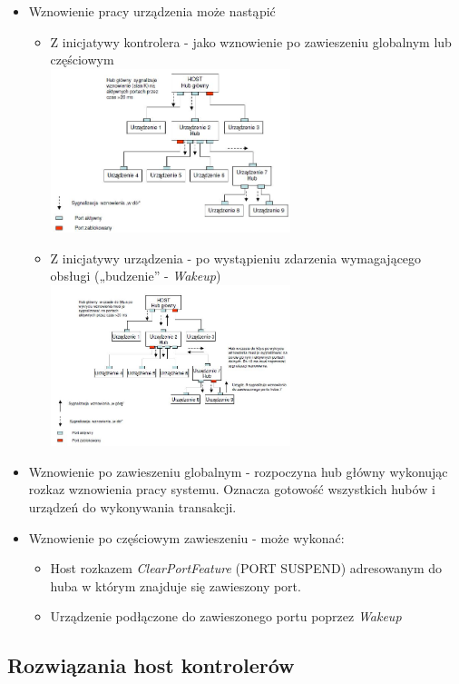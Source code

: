 \begin{itemize}
\begin{itemize}
			\item Wznowienie pracy urządzenia może nastąpić
			\newpage
			\begin{itemize}
				\item Z inicjatywy kontrolera - jako wznowienie po zawieszeniu globalnym lub częściowym\\
				\includegraphics[width=7cm]{./wyklady/USB_43_1.jpg}
				\item Z inicjatywy urządzenia - po wystąpieniu zdarzenia wymagającego obsługi („budzenie” - \emph{Wakeup})\\
				\includegraphics[width=7cm]{./wyklady/USB_44_1.jpg}
			\end{itemize}
			\item Wznowienie po zawieszeniu globalnym - rozpoczyna hub główny wykonując rozkaz wznowienia pracy systemu. Oznacza gotowość wszystkich hubów i urządzeń do wykonywania transakcji.
			\item Wznowienie po częściowym zawieszeniu - może wykonać:
			\begin{itemize}
				\item Host rozkazem \emph{ClearPortFeature} (PORT SUSPEND) adresowanym do huba w którym znajduje się zawieszony port.
				\item Urządzenie podłączone do zawieszonego portu poprzez \emph{Wakeup}
			\end{itemize}
		\end{itemize}
	\end{itemize}
	
\subsection{Rozwiązania host kontrolerów}
